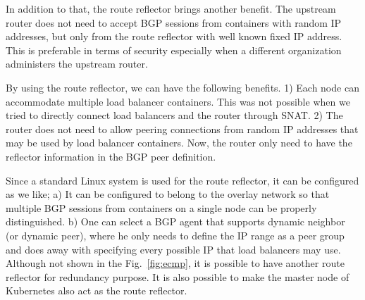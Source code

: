 In addition to that, the route reflector brings another benefit.
The upstream router does not need to accept BGP sessions from containers with random IP addresses, but only from the route reflector with well known fixed IP address.
This is preferable in terms of security especially when a different organization administers the upstream router.

By using the route reflector, we can have the following benefits.
1) Each node can accommodate multiple load balancer containers. This was not possible when we tried to directly connect load balancers and the router through SNAT.
2) The router does not need to allow peering connections from random IP addresses that may be used by load balancer containers. Now, the router only need to have the reflector information in the BGP peer definition.

Since a standard Linux system is used for the route reflector, it can be configured as we like;
a) It can be configured to belong to the overlay network so that multiple BGP sessions from containers on a single node can be properly distinguished.
b) One can select a BGP agent that supports dynamic neighbor (or dynamic peer), where he only needs to define the IP range as a peer group and does away with specifying every possible IP that load balancers may use.
Although not shown in the Fig.~\ref{fig:ecmp}, it is possible to have another route reflector for redundancy purpose.
It is also possible to make the master node of Kubernetes also act as the route reflector.

\FloatBarrier


